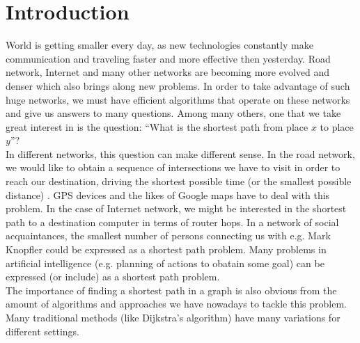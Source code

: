 \section{Introduction}
%   
World is getting smaller every day, as new technologies constantly make communication and traveling faster and more effective then yesterday. Road network, Internet and many other networks are becoming more evolved and denser which also brings along new problems. In order to take advantage of such huge networks, we must have efficient algorithms that operate on these networks and give us answers to many questions. Among many others, one that we take great interest in is the question: ``What is the shortest path from place $x$ to place $y$''? \\

In different networks, this question can make different sense. In the road network, we would like to obtain a sequence of intersections we have to visit in order to reach our destination, driving the shortest possible time (or the smallest possible distance) . GPS devices and the likes of Google maps have to deal with this problem. In the case of Internet network, we might be interested in the shortest path to a destination computer in terms of router hops. In a network of social acquaintances, the smallest number of persons connecting us with e.g. Mark Knopfler could be expressed as a shortest path problem. Many problems in artificial intelligence (e.g. planning of actions to obatain some goal) can be expressed (or include) as a shortest path problem. \\

The importance of finding a shortest path in a graph is also obvious from the amount of algorithms and approaches we have nowadays to tackle this problem. Many traditional methods (like Dijkstra's algorithm) have many variations %
for different settings. 



